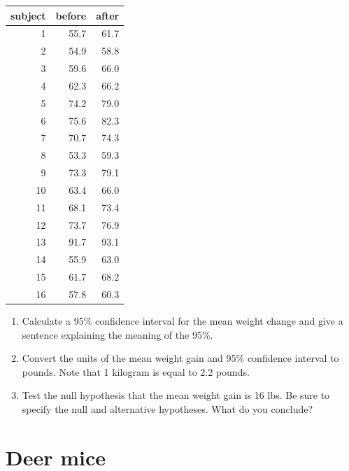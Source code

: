 \documentclass[letterpaper,9pt,twoside,printwatermark=false]{pinp}
\providecommand{\tightlist}{%
  \setlength{\itemsep}{0pt}\setlength{\parskip}{0pt}}
\begin{document}
\begin{tabular}{r|r|r}
\hline
subject & before & after\\
\hline
1 & 55.7 & 61.7\\
\hline
2 & 54.9 & 58.8\\
\hline
3 & 59.6 & 66.0\\
\hline
4 & 62.3 & 66.2\\
\hline
5 & 74.2 & 79.0\\
\hline
6 & 75.6 & 82.3\\
\hline
7 & 70.7 & 74.3\\
\hline
8 & 53.3 & 59.3\\
\hline
9 & 73.3 & 79.1\\
\hline
10 & 63.4 & 66.0\\
\hline
11 & 68.1 & 73.4\\
\hline
12 & 73.7 & 76.9\\
\hline
13 & 91.7 & 93.1\\
\hline
14 & 55.9 & 63.0\\
\hline
15 & 61.7 & 68.2\\
\hline
16 & 57.8 & 60.3\\
\hline
\end{tabular}

\begin{Shaded}
\begin{Highlighting}[]
\StringTok{ }\NormalTok{(}\NormalTok{)}
\end{Highlighting}
\end{Shaded}

\begin{enumerate}
\def\labelenumi{\alph{enumi}.}
\tightlist
\item
  Calculate a 95\% confidence interval for the mean weight change and
  give a sentence explaining the meaning of the 95\%.
\item
  Convert the units of the mean weight gain and 95\% confidence interval
  to pounds. Note that 1 kilogram is equal to 2.2 pounds.
\item
  Test the null hypothesis that the mean weight gain is 16 lbs. Be sure
  to specify the null and alternative hypotheses. What do you conclude?
\end{enumerate}

\section{Deer mice}\label{deer-mice}
\end{document}
